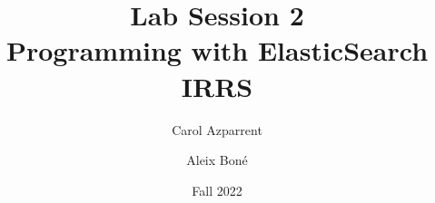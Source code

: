 



\usepackage{titling}
\usepackage{cancel}
\usepackage{booktabs}
\usepackage{graphicx}

\makeatletter
\g@addto@macro\@floatboxreset\centering
\makeatother




\title{Lab Session 2\\ \Large \normalfont
  Programming with ElasticSearch\\ IRRS
}
\author{
  Carol Azparrent
\and
  Aleix Boné
}
\date{Fall 2022}

\setlength{\droptitle}{-5.0em}




\renewcommand\and{\\[\baselineskip]}
    

\setlength{\parskip}{1em plus 0.5em minus 0.2em}

    
    

\null
\vfill
\printbibliography

